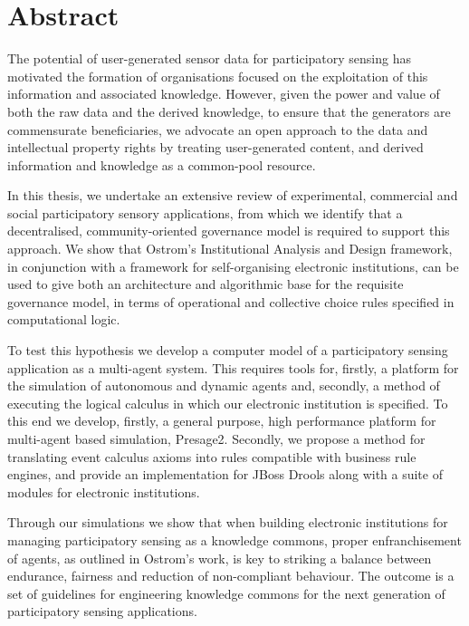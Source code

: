 \begingroup
\let\clearpage\relax
\let\cleardoublepage\relax
\let\cleardoublepage\relax

\chapter*{Abstract}

The potential of user-generated sensor data for participatory sensing has motivated the formation of organisations focused on the exploitation of this information and associated knowledge. 
However, given the power and value of both the raw data and the derived knowledge, to ensure that the
generators are commensurate beneficiaries, we advocate an open approach to the data and intellectual
property rights by treating user-generated content, and derived information and knowledge 
as a common-pool resource.

In this thesis, we undertake an extensive review of experimental, commercial and social participatory sensory applications, from which we identify that a decentralised, community-oriented governance model is required
to support this approach. We show that Ostrom's Institutional Analysis and Design framework, in conjunction
with a framework for self-organising electronic institutions, can be used to give both an architecture
and algorithmic base for the requisite governance model, in terms of operational and collective choice rules
specified in computational logic.

To test this hypothesis we develop a computer model of a participatory sensing application as a multi-agent system. This requires tools for, firstly, a platform for the simulation of autonomous and dynamic agents and, secondly, a method of executing the logical calculus in which our electronic institution is specified. To this end we develop, firstly, a general purpose, high performance platform for multi-agent based simulation, Presage2. Secondly, we propose a method for translating event calculus axioms into rules compatible with business rule engines, and provide an implementation for JBoss Drools along with a suite of modules for electronic institutions.

Through our simulations we show that when building electronic institutions for managing participatory sensing as a knowledge commons, proper enfranchisement of agents, as outlined in Ostrom's work, is key to striking a balance between endurance, fairness and reduction of non-compliant behaviour. The outcome is a set of guidelines for engineering knowledge commons for the next generation of participatory sensing applications.

